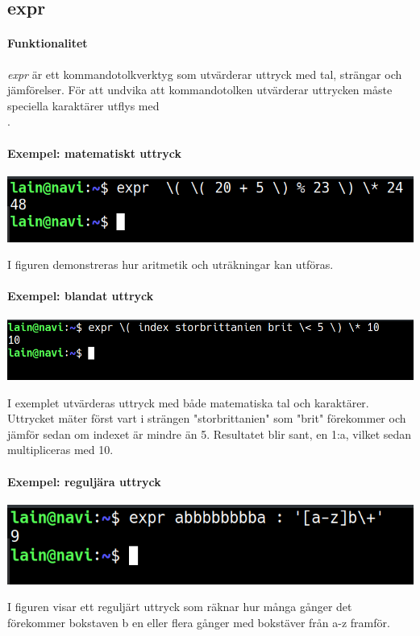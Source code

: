 \subsection{expr}
\paragraph{Funktionalitet}
\emph{expr} är ett kommandotolkverktyg som utvärderar uttryck med tal, strängar och jämförelser. För att undvika att kommandotolken utvärderar uttrycken måste speciella karaktärer utflys med \\. 
\paragraph{Exempel: matematiskt uttryck}
\begin{center}
        \includegraphics[width=\linewidth]{bilder/expr_matte.png}
\end{center}
I figuren demonstreras hur aritmetik och uträkningar kan utföras.
\paragraph{Exempel: blandat uttryck}
\begin{center}
        \includegraphics[width=\linewidth]{bilder/expr_blandat.png}
\end{center}
I exemplet utvärderas uttryck med både matematiska tal och karaktärer. Uttrycket mäter först vart i strängen "storbrittanien" som "brit" förekommer och jämför sedan om indexet är mindre än 5. Resultatet blir sant, en 1:a, vilket sedan multipliceras med 10.  
\paragraph{Exempel: reguljära uttryck}
\begin{center}
        \includegraphics[width=\linewidth]{bilder/expr_regular.png}
\end{center}
I figuren visar ett reguljärt uttryck som räknar hur många gånger det förekommer bokstaven b en eller flera gånger med bokstäver från a-z framför.
